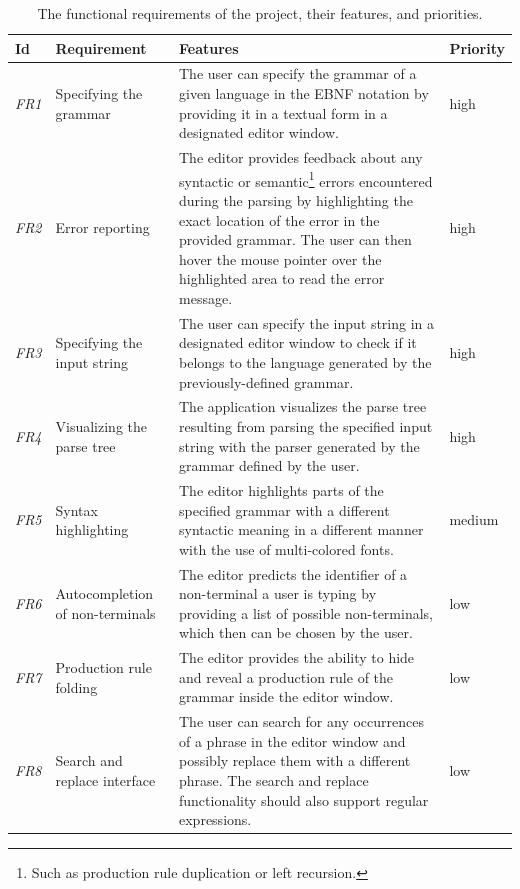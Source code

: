 \documentclass[english,engineering]{wizthesis}
\begin{document}
\begin{xltabular}{\textwidth}{@{}lL{3cm}Xl@{}}
  \caption{The functional requirements of the project, their features, and
  priorities.}
  \label{tab:functional-requirements}\\
  \toprule
  Id & Requirement & Features & Priority \\* \midrule
  \endfirsthead
  \endhead
  \endfoot
  \endlastfoot
  \emph{FR1} & Specifying the grammar & The user can specify the grammar of a
  given language in the EBNF notation by providing it in a textual form in
  a designated editor window. & high \\
  \addlinespace[0.5em] \emph{FR2} & Error reporting & The editor provides
  feedback about any syntactic or semantic\footnote{Such as production
  rule duplication or left recursion.} errors encountered during the parsing by
  highlighting the exact location of the error in the provided grammar. The user
  can then hover the mouse pointer over the highlighted area to read the error
  message. & high \\
  \addlinespace[0.5em] \emph{FR3} & Specifying the input string & The user can
  specify the input string in a designated editor window to check if it
  belongs to the language generated by the previously-defined grammar. & high
  \\
  \addlinespace[0.5em] \emph{FR4} & Visualizing the parse tree & The
  application visualizes the parse tree resulting from parsing the specified
  input string with the parser generated by the grammar defined by the user. &
  high \\
  \addlinespace[0.5em] \emph{FR5} & Syntax highlighting & The editor highlights
  parts of the specified grammar with a different syntactic meaning in a
  different manner with the use of multi-colored fonts. & medium \\
  \addlinespace[0.5em] \emph{FR6} & Autocompletion of non-terminals & The
  editor predicts the identifier of a non-terminal a user is typing by
  providing a list of possible non-terminals, which then can be chosen by the
  user. & low \\
  \addlinespace[0.5em] \emph{FR7} & Production rule folding & The editor
  provides the ability to hide and reveal a production rule of the grammar
  inside the editor window. & low \\
  \addlinespace[0.5em] \emph{FR8} & Search and replace interface & The user can
  search for any occurrences of a phrase in the editor window and possibly
  replace them with a different phrase. The search and replace functionality
  should also support regular expressions. & low \\* \bottomrule
\end{xltabular}
\end{document}
